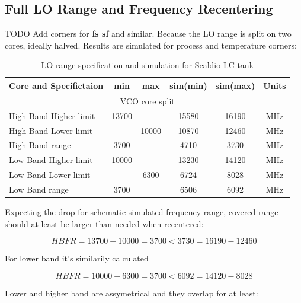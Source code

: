 \documentclass{article}
\begin{document}
\subsection{Full LO Range and Frequency Recentering}


TODO Add corners for \textbf{fs sf} and similar. Because the LO range is split on two cores, ideally halved. Results are simulated for process and temperature corners: 

\begin{table}[ht]
	\centering
	\begin{tabular}{|l|c|c|c|c|c|}
		\hline
		Core and Specifictaion & min & max & sim(min) & sim(max) & Units \\
		\hline
		\multicolumn{6}{|c|}{VCO core split} \\
		\hline
		High Band Higher limit & 13700 &  & 15580 & 16190  &  MHz  \\ 
		\hline
		High Band Lower limit &  & 10000 & 10870 & 12460 &  MHz  \\ 
		\hline
		High Band range & 3700 &  & 4710 & 3730 &  MHz  \\ 
		\hline
		Low Band Higher limit & 10000 &   & 13230 & 14120 &  MHz  \\ 
		\hline
		Low Band Lower limit &  & 6300 & 6724 & 8028  &  MHz  \\ 
		\hline
		Low Band range & 3700 &  & 6506 & 6092 &  MHz  \\ 
		\hline
	\end{tabular}
	\caption{LO range specification and simulation for Scaldio LC tank}
\end{table}

Expecting the drop for schematic simulated frequency range, covered range should at least be larger than needed when recentered: 

\begin{equation}
	HBFR = 13700 - 10000 = 3700 < 3730 = 16190 - 12460
\end{equation}

For lower band it's similarily calculated

\begin{equation}
	HBFR = 10000 - 6300 = 3700 < 6092 = 14120 - 8028
\end{equation}

Lower and higher band are assymetrical and they overlap for at least:
\end{document}

